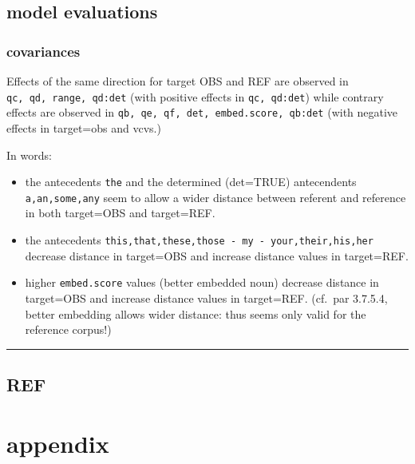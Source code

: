 \documentclass[12pt,a4paper]{article}
\begin{document}
\section{model evaluations}\label{model-evaluations}

\subsection{covariances}\label{covariances}

Effects of the same direction for target OBS and REF are observed in \texttt{qc,\ qd,\ range,\ qd:det} (with positive effects in \texttt{qc,\ qd:det}) while contrary effects are observed in \texttt{qb,\ qe,\ qf,\ det,\ embed.score,\ qb:det} (with negative effects in target=obs and vcvs.)

In words:

\begin{itemize}
\tightlist
\item
  the antecedents \texttt{the} and the determined (det=TRUE) antecendents \texttt{a,an,some,any} seem to allow a wider distance between referent and reference in both target=OBS and target=REF.
\item
  the antecedents \texttt{this,that,these,those\ -\ my\ -\ your,their,his,her} decrease distance in target=OBS and increase distance values in target=REF.
\item
  higher \texttt{embed.score} values (better embedded noun) decrease distance in target=OBS and increase distance values in target=REF. (cf.~par 3.7.5.4, better embedding allows wider distance: thus seems only valid for the reference corpus!)
\end{itemize}

\begin{center}\rule{0.5\linewidth}{0.5pt}\end{center}

\section{REF}\label{ref}

\begin{Shaded}
\begin{Highlighting}[]
\end{Highlighting}
\end{Shaded}

\chapter{appendix}\label{appendix}
\end{document}
